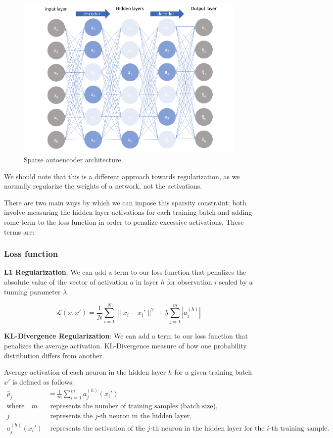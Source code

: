 \documentclass{article}
\begin{document}
		\begin{figure}[H]
			\centering
			\includegraphics[width=0.8\linewidth]{images/sparse_autoencoder.png}
			\caption{Sparse autoencoder architecture}
			\label{fig:sparse-autoencoder}
		\end{figure}
			
		We should note that this is a different approach towards regularization, as we normally regularize the weights of a network, not the activations.

		There are two main ways by which we can impose this sparsity constraint; both involve measuring the hidden layer activations for each training batch and adding some term to the loss function in order to penalize excessive activations. These terms are:

		\subsubsection{Loss function}

		\textbf{L1 Regularization}: We can add a term to our loss function that penalizes the absolute value of the vector of activation \(a\) in layer \(h\) for observation \(i\) scaled by a tunning parameter \(\lambda\).

		\[ \mathcal{L}(x, x') = \frac{1}{N} \sum_{i=1}^{N} \|x_i - x_i'\|^2 + \lambda \sum_{j=1}^{m} |a_j^{(h)}| \]

		\textbf{KL-Divergence Regularization}: We can add a term to our loss function that penalizes the average activation. KL-Divergence measure of how one probability distribution differs from another. 

		Average activation of each neuron in the hidden layer \(h\) for a given training batch \(x'\) is defined as follows:
		\begin{align}
			\hat{\rho}_j &= \frac{1}{m} \sum_{i=1}^{m} a_j^{(h)}(x_i') \\
			\text{where} \quad m &\text{ represents the number of training samples (batch size),} \nonumber \\
			j &\text{ represents the } j\text{-th neuron in the hidden layer,} \nonumber \\
			a_j^{(h)}(x_i') &\text{ represents the activation of the } j\text{-th neuron in the hidden layer for the } i\text{-th training sample.} \nonumber
		\end{align}
\end{document}

